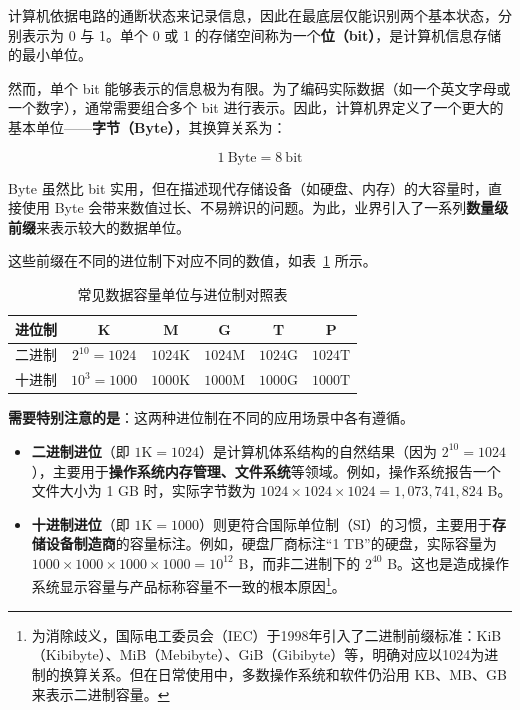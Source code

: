 \documentclass[12pt,UTF8]{ctexbook}
\begin{document}
计算机依据电路的通断状态来记录信息，因此在最底层仅能识别两个基本状态，分别表示为 0 与 1。单个 0 或 1 的存储空间称为一个\textbf{位（bit）}，是计算机信息存储的最小单位。

然而，单个 bit 能够表示的信息极为有限。为了编码实际数据（如一个英文字母或一个数字），通常需要组合多个 bit 进行表示。因此，计算机界定义了一个更大的基本单位——\textbf{字节（Byte）}，其换算关系为：

\begin{equation}
	1\ \text{Byte} = 8\ \text{bit}
\end{equation}

Byte 虽然比 bit 实用，但在描述现代存储设备（如硬盘、内存）的大容量时，直接使用 Byte 会带来数值过长、不易辨识的问题。为此，业界引入了一系列\textbf{数量级前缀}来表示较大的数据单位。

这些前缀在不同的进位制下对应不同的数值，如表~\ref{tab:storage_units} 所示。

\begin{table}[htbp]
	\centering
	\caption{常见数据容量单位与进位制对照表}
	\label{tab:storage_units}
	\begin{tabular}{|c|c|c|c|c|c|}
		\hline
		\textbf{进位制} & \textbf{K} & \textbf{M} & \textbf{G} & \textbf{T} & \textbf{P} \\
		\hline
		二进制 & $2^{10} = 1024$ & $1024\text{K}$ & $1024\text{M}$ & $1024\text{G}$ & $1024\text{T}$ \\
		\hline
		十进制 & $10^3 = 1000$ & $1000\text{K}$ & $1000\text{M}$ & $1000\text{G}$ & $1000\text{T}$ \\
		\hline
	\end{tabular}
\end{table}

\textbf{需要特别注意的是}：这两种进位制在不同的应用场景中各有遵循。

\begin{itemize}
	\item \textbf{二进制进位}（即 $1\text{K} = 1024$）是计算机体系结构的自然结果（因为 $2^{10} = 1024$），主要用于\textbf{操作系统内存管理、文件系统}等领域。例如，操作系统报告一个文件大小为 1 GB 时，实际字节数为 $1024 \times 1024 \times 1024 = 1,073,741,824$ B。
	\item \textbf{十进制进位}（即 $1\text{K} = 1000$）则更符合国际单位制（SI）的习惯，主要用于\textbf{存储设备制造商}的容量标注。例如，硬盘厂商标注“1 TB”的硬盘，实际容量为 $1000 \times 1000 \times 1000 \times 1000 = 10^{12}$ B，而非二进制下的 $2^{40}$ B。这也是造成操作系统显示容量与产品标称容量不一致的根本原因\footnote{为消除歧义，国际电工委员会（IEC）于1998年引入了二进制前缀标准：KiB（Kibibyte）、MiB（Mebibyte）、GiB（Gibibyte）等，明确对应以1024为进制的换算关系。但在日常使用中，多数操作系统和软件仍沿用 KB、MB、GB 来表示二进制容量。}。
\end{itemize}
\end{document}
